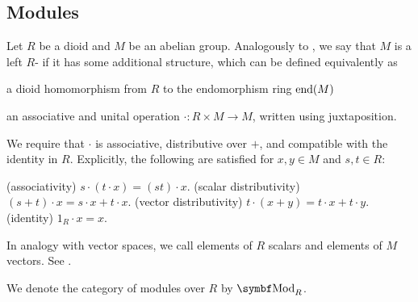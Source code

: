 \subsection{Modules}\label{subsec:modules}

\begin{definition}\label{def:left_module}
  Let \( R \) be a dioid and \( M \) be an abelian group. Analogously to , we say that \( M \) is a left \( R \)- if it has some additional structure, which can be defined equivalently as
  \begin{defenum}
     a dioid homomorphism from \( R \) to the endomorphism ring \( \operatorname{end}(M) \)

    \cite[374]{Knapp2016BAlg} an associative  and unital operation \( \cdot: R \times M \to M \), written using juxtaposition.

    We require that \( \cdot \) is associative, distributive over \( + \), and compatible with the identity in \( R \). Explicitly, the following are satisfied for \( x, y \in M \) and \( s, t \in R \):
    \begin{description}
      (associativity) \( s \cdot (t \cdot x) = (s t) \cdot x \).
      (scalar distributivity) \( (s + t) \cdot x = s \cdot x + t \cdot x \).
      (vector distributivity) \( t \cdot (x + y) = t \cdot x + t \cdot y \).
      (identity) \( 1_R \cdot x = x \).
    \end{description}
  \end{defenum}

  In analogy with vector spaces, we call elements of \( R \) scalars and elements of \( M \) vectors. See .

  We denote the category of modules over \( R \) by \( \Cat{Mod}_R \).
\end{definition}
